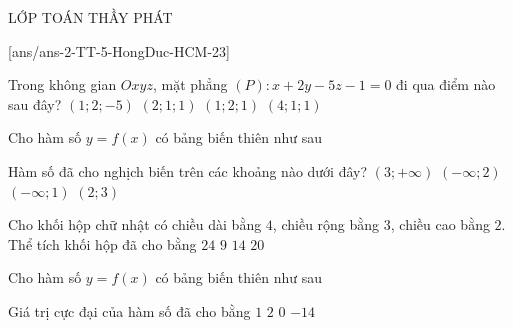 \begin{name}
	{\tenchude}{\tendethi}{LỚP TOÁN THẦY PHÁT}{\thoigian}
\end{name}
\setcounter{ex}{0}\setcounter{bt}{0}
[ans/ans-2-TT-5-HongDuc-HCM-23]
\begin{ex}%
	Trong không gian $Oxyz$, mặt phẳng $(P)\colon x+2y-5z-1=0$ đi qua điểm nào sau đây?
	\choice
	{$(1;2;-5)$}
	{$(2;1;1)$}
	{$(1;2;1)$}
	{\True $(4;1;1)$}
\end{ex}

\begin{ex}%
	Cho hàm số $y=f(x)$ có bảng biến thiên như sau
\begin{center}
\end{center}
Hàm số đã cho nghịch biến trên các khoảng nào dưới đây?
	\choice
	{$(3;+\infty)$}
	{$(-\infty;2)$}
	{$(-\infty;1)$}
	{\True $(2;3)$}
\end{ex}

\begin{ex}%
Cho khối hộp chữ nhật có chiều dài bằng $4$, chiều rộng bằng $3$, chiều cao bằng $2$. Thể tích khối hộp đã cho bằng 	
	\choice
	{\True $24$}
	{$9$}
	{$14$}
	{$20$}
\end{ex}

\begin{ex}%
	Cho hàm số $y=f(x)$ có bảng biến thiên như sau
\begin{center}
\end{center}
Giá trị cực đại của hàm số đã cho bằng	
	\choice
	{$1$}
	{\True $2$}
	{$0$}
	{$-14$}
\end{ex}

